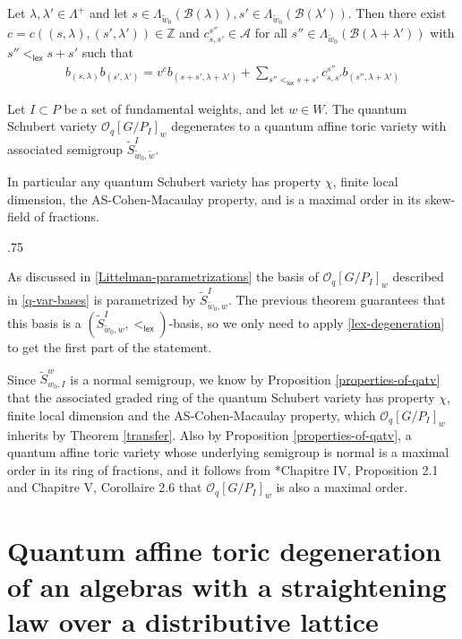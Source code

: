 \documentclass[11pt,fleqn]{article}
\makeatletter
\renewenvironment{proof}[1][\textit{Proof}]{\par
  \pushQED{\qed}%
  \normalfont \topsep.75\paraskip\relax
  \trivlist
  \item[\hskip\labelsep
        \itshape
    #1\@addpunct{.}]\ignorespaces
}{%
  \popQED\endtrivlist\@endpefalse
}
\newcommand\ZZ{\mathbb Z}
\newcommand\A{\mathcal A}
\newcommand\B{\mathcal B}
\renewcommand\O{\mathcal O}
\newcommand\lex{\mathsf{lex}}
\makeatother
\begin{document}
\begin{Proposition*}
Let $\lambda, \lambda' \in \Lambda^+$ and let $s \in \Lambda_{\tilde w_0}
(\B(\lambda)), s' \in \Lambda_{\tilde w_0}(\B(\lambda'))$. Then there exist 
$c = c((s,\lambda),(s',\lambda')) \in \ZZ$ and $c_{s, s'}^{s''} \in \A$ 
for all $s'' \in \Lambda_{\tilde w_0}(\B(\lambda + \lambda'))$ with $s'' 
<_{\lex} s+ s'$ such that 
\begin{align*}
\label{product-formula} 
b_{(s, \lambda)} b_{(s', \lambda')}
  = v^c b_{(s+s', \lambda + \lambda')} 
    + \sum_{s'' <_{\lex} s+s'} c_{s,s'}^{s''} b_{(s'', \lambda + \lambda')}
\end{align*} 
\end{Proposition*} 



\begin{Theorem}
\label{Schubert-deg}
Let $I \subset P$ be a set of fundamental weights, and let $w \in W$.
The quantum Schubert variety $\O_q[G/P_I]_w$ degenerates to a quantum affine toric 
variety with associated semigroup $\tilde S^I_{\tilde w_0, \tilde w}$. 

In particular any quantum Schubert variety has property $\chi$, finite local dimension, 
the AS-Cohen-Macaulay property, and is a maximal order in its skew-field of fractions.
\end{Theorem}
\begin{proof}
As discussed in \ref{Littelman-parametrizations} the basis of $\O_q[G/P_I]_w$ described
in \ref{q-var-bases} is parametrized by $\tilde S^I_{\tilde w_0, w}$. The previous theorem
guarantees that this basis is a $(\tilde S^I_{\tilde w_0, w},<_{\lex})$-basis, so we
only need to apply \ref{lex-degeneration} to get the first part of the statement.

Since $\tilde S^w_{w_0, I}$ is a normal semigroup, we know by Proposition 
\ref{properties-of-qatv} that the associated graded ring of the quantum Schubert variety
has property $\chi$, finite local dimension and the AS-Cohen-Macaulay property, which 
$\O_q[G/P_I]_w$ inherits by Theorem \ref{transfer}. Also by Proposition 
\ref{properties-of-qatv}, a quantum affine toric variety whose underlying semigroup is 
normal is a maximal order in its ring of fractions, and it follows from 
\cite{Mau}*{Chapitre IV, Proposition 2.1 and Chapitre V, Corollaire 2.6} that 
$\O_q[G/P_I]_w$ is also a maximal order. 
\end{proof}


\section{Quantum affine toric degeneration of an algebras with a straightening law over 
a distributive lattice}
\label{richardson}
\end{document}
